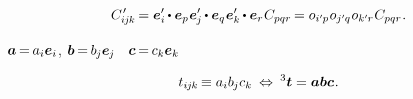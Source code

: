 \nopagebreak\vspace{-0.2em}\begin{equation}\label{orthotransform:3}
C\hspace{.16ex}'_{\hspace{-0.33ex}i\hspace{-0.1ex}j\hspace{-0.1ex}k} \hspace{-0.2ex}
= \bm{e}'_i \hspace{-0.15ex} \dotp \bm{e}_p \hspace{.1ex} \bm{e}'_{\hspace{-0.1ex}j} \hspace{-0.15ex} \dotp \bm{e}_q \hspace{.1ex} \bm{e}'_k \hspace{-0.15ex} \dotp \bm{e}_r \hspace{.1ex} C_{pqr} \hspace{-0.2ex}
= \cosinematrix{i'\hspace{-0.1ex}p} \hspace{.1ex} \cosinematrix{j'\hspace{-0.1ex}q} \hspace{.1ex} \cosinematrix{k'\hspace{-0.1ex}r} \hspace{.1ex} C_{pqr}
\hspace{.1ex} .
\end{equation}


\ru{\:---}   ${\bm{a} \hspace{-0.2ex} = \hspace{-0.2ex} a_i \bm{e}_i}$, ${\bm{b} \hspace{-0.2ex} = \hspace{-0.2ex} b_{\hspace{-0.1ex}j} \bm{e}_{\hspace{-0.1ex}j}}$ ~${\bm{c} \hspace{-0.2ex} = \hspace{-0.2ex} c_k \bm{e}_k}$

\nopagebreak\vspace{-1em}\begin{equation*}
t_{i\hspace{-0.1ex}j\hspace{-0.1ex}k} \hspace{-0.2ex} \equiv a_i b_{\hspace{-0.1ex}j} c_k
\:\Leftrightarrow\:
{^3\bm{t}} = \bm{a} \bm{b} \bm{c}
\hspace{.1ex} .
\end{equation*}

